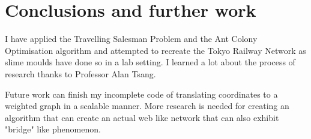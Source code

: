 \documentclass[12pt,a4paper]{article}
\begin{document}
\section{Conclusions and further work}
I have applied the Travelling Salesman Problem and the Ant Colony Optimisation algorithm and attempted to recreate the Tokyo Railway Network as slime moulds have done so in a lab setting. I learned a lot about the process of research thanks to Professor Alan Tsang.

Future work can finish my incomplete code of translating coordinates to a weighted graph in a scalable manner. More research is needed for creating an algorithm that can create an actual web like network that can also exhibit "bridge" like phenomenon.

\printbibliography[heading=bibintoc]
\end{document}

